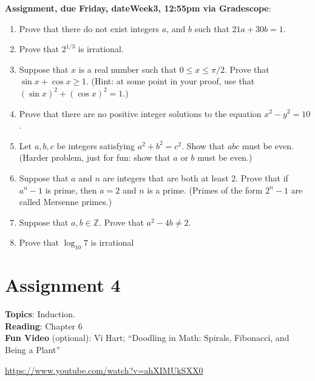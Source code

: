 \documentclass[12pt]{article}
\newcommand{\HWdueTime}{12:55pm }
\begin{document}
\noindent \textbf{Assignment, due Friday, \csname dateWeek3\endcsname, \HWdueTime via Gradescope}:
\begin{enumerate}
\item Prove that there do not exist integers $a$, and $b$ such that $21a + 30b = 1$.
\item Prove that $2^{1/3}$ is irrational.
\item Suppose that $x$ is a real number such that $0 \leq x \leq \pi/2$. Prove that $\sin x + \cos x \geq 1$. (Hint: at some point in your proof, use that $(\sin x)^2 + (\cos x)^2 = 1$.)
\item Prove that there are no positive integer solutions to the equation $x^2 - y^2 = 10$.
\item Let $a, b, c$ be integers satisfying $a^2 + b^2 = c^2$. Show that $abc$ must be even. (Harder problem, just for fun: show that $a$ or $b$ must be even.)
\item Suppose that $a$ and $n$ are integers that are both at least 2. Prove that if $a^n -1$ is prime, then $a = 2$ and $n$ is a prime. (Primes of the form $2^n - 1$ are called Mersenne primes.)
\item Suppose that $a,b \in \mathbb{Z}$. Prove that $a^2 - 4b \neq 2$.

\item Prove that $\log_{10} 7$ is irrational
\end{enumerate}


\newpage
\section[4 (due \csname dateWeek4\endcsname): Induction.]{Assignment 4}

\textbf{Topics}: Induction.
\\

\noindent \textbf{Reading}: Chapter 6
\\

\noindent \textbf{Fun Video} (optional): Vi Hart; ``Doodling in Math: Spirals, Fibonacci, and Being a Plant''

\noindent \url{https://www.youtube.com/watch?v=ahXIMUkSXX0}
\\ 
\end{document}
